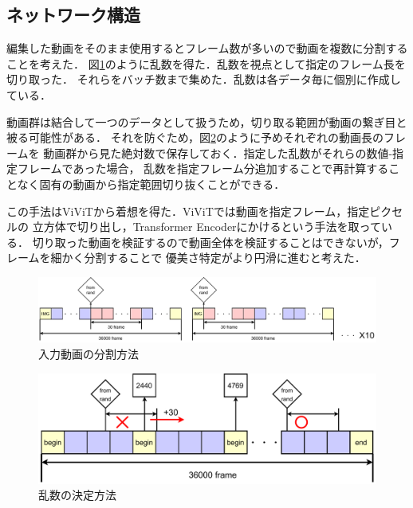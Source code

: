 \subsection{ネットワーク構造}
編集した動画をそのまま使用するとフレーム数が多いので動画を複数に分割することを考えた．
図\ref{range}のように乱数を得た．乱数を視点として指定のフレーム長を切り取った．
それらをバッチ数まで集めた．乱数は各データ毎に個別に作成している．

動画群は結合して一つのデータとして扱うため，切り取る範囲が動画の繋ぎ目と被る可能性がある．
それを防ぐため，図\ref{decide_rand}のように予めそれぞれの動画長のフレームを
動画群から見た絶対数で保存しておく．指定した乱数がそれらの数値-指定フレームであった場合，
乱数を指定フレーム分追加することで再計算することなく固有の動画から指定範囲切り抜くことができる．

この手法はViViTから着想を得た．ViViTでは動画を指定フレーム，指定ピクセルの
立方体で切り出し，Transformer Encoderにかけるという手法を取っている．
切り取った動画を検証するので動画全体を検証することはできないが，フレームを細かく分割することで
優美さ特定がより円滑に進むと考えた．

\begin{figure}[b]
  \begin{center}
    \includegraphics[width=120mm]{images/chart/range.pdf}
  \end{center}
  \caption{入力動画の分割方法}
  \label{range}
\end{figure}

\begin{figure}[b]
  \begin{center}
    \includegraphics[width=120mm]{images/chart/decide_rand.pdf}
  \end{center}
  \caption{乱数の決定方法}
  \label{decide_rand}
\end{figure}
\clearpage

